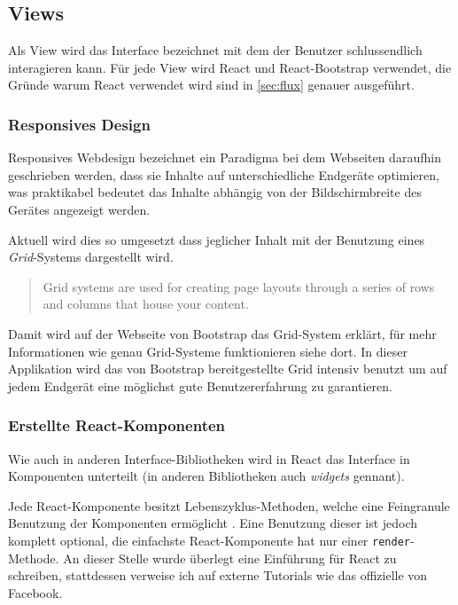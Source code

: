 \documentclass[12pt,twoside]{book}
\begin{document}
\subsection{Views}

Als View wird das Interface bezeichnet mit dem der Benutzer schlussendlich interagieren kann. Für jede View wird React und React-Bootstrap verwendet, die Gründe warum React verwendet wird sind in \ref{sec:flux} genauer ausgeführt.

\subsubsection{Responsives Design}

Responsives Webdesign bezeichnet ein Paradigma bei dem Webseiten daraufhin geschrieben werden, dass sie Inhalte auf unterschiedliche Endgeräte optimieren, was praktikabel bedeutet das Inhalte abhängig von der Bildschirmbreite des Gerätes angezeigt werden.

Aktuell wird dies so umgesetzt dass jeglicher Inhalt mit der Benutzung eines \textit{Grid}-Systems dargestellt wird.

\begin{quote}
	Grid systems are used for creating page layouts through a series of rows and columns that house your content.
\end{quote}

Damit wird auf der Webseite von Bootstrap \cite{bootstrap} das Grid-System erklärt, für mehr Informationen wie genau Grid-Systeme funktionieren siehe dort.
In dieser Applikation wird das von Bootstrap bereitgestellte Grid intensiv benutzt um auf jedem Endgerät eine möglichst gute Benutzererfahrung zu garantieren. 

\subsubsection{Erstellte React-Komponenten}

Wie auch in anderen Interface-Bibliotheken wird in React das Interface in Komponenten unterteilt (in anderen Bibliotheken auch \textit{widgets} gennant).

Jede React-Komponente besitzt Lebenszyklus-Methoden, welche eine Feingranule Benutzung der Komponenten ermöglicht \cite{lifecycle}.
Eine Benutzung dieser ist jedoch komplett optional, die einfachste React-Komponente hat nur einer \texttt{render}-Methode. An dieser Stelle wurde überlegt eine Einführung für React zu schreiben, stattdessen verweise ich auf externe Tutorials wie das offizielle von Facebook\cite{tutorial}.
\end{document}
